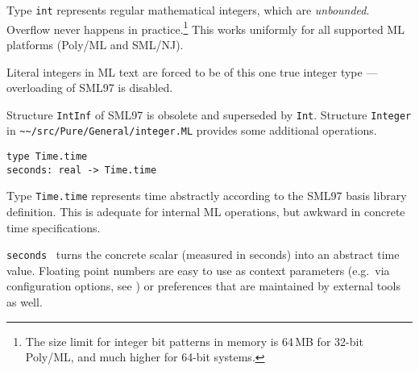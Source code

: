 \begin{isabellebody}
\begin{isamarkuptext}
  \begin{description}

  \item Type \verb|int| represents regular mathematical integers,
  which are \emph{unbounded}.  Overflow never happens in
  practice.\footnote{The size limit for integer bit patterns in memory
  is 64\,MB for 32-bit Poly/ML, and much higher for 64-bit systems.}
  This works uniformly for all supported ML platforms (Poly/ML and
  SML/NJ).

  Literal integers in ML text are forced to be of this one true
  integer type --- overloading of SML97 is disabled.

  Structure \verb|IntInf| of SML97 is obsolete and superseded by
  \verb|Int|.  Structure \verb|Integer| in \verb|~~/src/Pure/General/integer.ML| provides some additional
  operations.

  \end{description}%
\end{isamarkuptext}%
\isamarkuptrue%
%
\endisatagmlref
{\isafoldmlref}%
%
\isadelimmlref
%
\endisadelimmlref
%
\isamarkuptrue%
%
\isadelimmlref
%
\endisadelimmlref
%
\isatagmlref
%
\begin{isamarkuptext}%
\begin{mldecls}
  \verb|type Time.time| \\
  \verb|seconds: real -> Time.time| \\
  \end{mldecls}

  \begin{description}

  \item Type \verb|Time.time| represents time abstractly according
  to the SML97 basis library definition.  This is adequate for
  internal ML operations, but awkward in concrete time specifications.

  \item \verb|seconds|~ turns the concrete scalar  (measured in seconds) into an abstract time value.  Floating
  point numbers are easy to use as context parameters (e.g.\ via
  configuration options, see ) or
  preferences that are maintained by external tools as well.


\end{description}
\end{isamarkuptext}
\end{isabellebody}
